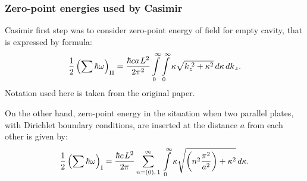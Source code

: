 \documentclass[10pt,t]{beamer}
\begin{document}
\begin{frame}
  \frametitle{Zero-point energies used by Casimir}


  Casimir first step was to consider zero-point energy of field for empty
  cavity, that is expressed by formula:
  \begin{equation}
    \label{eq:Short-history-ETC-01}
    \frac{ 1 }{ 2 } \left( \sum \hbar \omega \right)_{ \text{II} } =
    \frac{ \hbar c a \hspace{0.11em} L^{ 2 } }{ 2 \pi^{ 2 } }
    \int\limits_{ 0 }^{ \infty } \int\limits_{ 0 }^{ \infty } \kappa
    \sqrt{ k_{ \hspace{0.05em} z }^{ \,\, 2 } + \kappa^{ 2 } } \, d\kappa \,
    dk_{ \hspace{0.07em} z }.
  \end{equation}
  Notation used here is taken from the original paper.

  On the other hand, zero-point energy in the situation when
  two parallel plates, with Dirichlet boundary conditions, are
  inserted at the distance $a$ from each other is given by:
  \begin{equation}
    \label{eq:Short-history-ETC-02}
    \frac{ 1 }{ 2 } \left( \sum \hbar \omega \right)_{ \text{I} } =
    \frac{ \hbar c \hspace{0.11em} L^{ 2 } }{ 2 \pi }
    \sum_{ n = ( 0 ), \, 1 }^{ \infty } \, \int\limits_{ 0 }^{ \infty } \kappa
    \sqrt{ \left( n^{ 2 } \frac{ \pi^{ 2 } }{ a^{ 2 } } \right)
      + \kappa^{ 2 } } \, d\kappa.
  \end{equation}

\end{frame}
\end{document}
